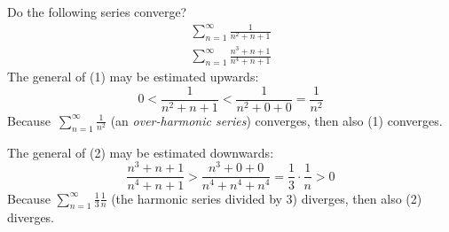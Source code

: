 \documentclass[12pt]{article}
\begin{document}
Do the following series converge?
\begin{align}
\sum_{n=1}^\infty \frac{1}{n^2+n+1}
\end{align}
\begin{align}
\sum_{n=1}^\infty \frac{n^3+n+1}{n^4+n+1}
\end{align}
The general  of (1) may be estimated upwards:
$$0 < \frac{1}{n^2+n+1} < \frac{1}{n^2+0+0} = \frac{1}{n^2}$$
Because\, $\sum_{n=1}^\infty \frac{1}{n^2}$ (an {\em over-harmonic series}) converges, then also (1) converges.

The general  of (2) may be estimated downwards:
$$\frac{n^3+n+1}{n^4+n+1} > \frac{n^3+0+0}{n^4+n^4+n^4} = 
  \frac{1}{3}\cdot\frac{1}{n} > 0$$
Because $\sum_{n=1}^\infty \frac{1}{3}\frac{1}{n}$ (the harmonic series divided by 3) diverges, then also (2) diverges.
\end{document}
